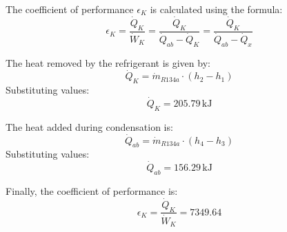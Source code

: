 The coefficient of performance \( \epsilon_K \) is calculated using the formula:  
\[
\epsilon_K = \frac{\dot{Q}_K}{\dot{W}_K} = \frac{\dot{Q}_K}{\dot{Q}_{ab} - \dot{Q}_K} = \frac{\dot{Q}_K}{\dot{Q}_{ab} - \dot{Q}_x}
\]

The heat removed by the refrigerant is given by:  
\[
\dot{Q}_K = \dot{m}_{R134a} \cdot (h_2 - h_1)
\]  
Substituting values:  
\[
\dot{Q}_K = 205.79 \, \text{kJ}
\]

The heat added during condensation is:  
\[
\dot{Q}_{ab} = \dot{m}_{R134a} \cdot (h_4 - h_3)
\]  
Substituting values:  
\[
\dot{Q}_{ab} = 156.29 \, \text{kJ}
\]

Finally, the coefficient of performance is:  
\[
\epsilon_K = \frac{\dot{Q}_K}{\dot{W}_K} = 7349.64
\]